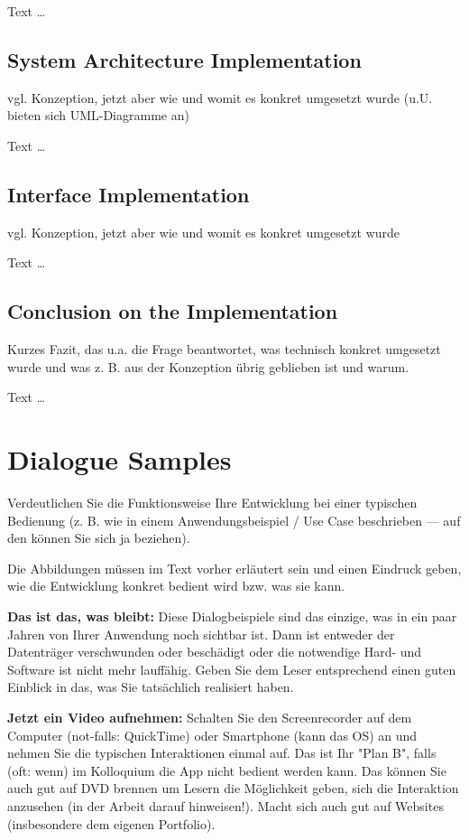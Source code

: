 \documentclass[11pt,a4paper,english]{scrreprt}
\newenvironment{comment}
  {\par\medskip
   \begingroup\color{olive}%
   }
 {\endgroup
  \medskip}
\begin{document}
Text \dots

\section{System Architecture Implementation}
\begin{comment}
vgl. Konzeption, jetzt aber wie und womit es konkret umgesetzt wurde (u.U. bieten sich UML-Diagramme an)
\end{comment}

Text \dots

\section{Interface Implementation}
\begin{comment}
vgl. Konzeption, jetzt aber wie und womit es konkret umgesetzt wurde 
\end{comment}

Text \dots

\section{Conclusion on the Implementation}
\begin{comment}
Kurzes Fazit, das u.a. die Frage beantwortet, was technisch konkret umgesetzt wurde und was z. B. aus der Konzeption übrig geblieben ist und warum.
\end{comment}

Text \dots

\newpage
\chapter{Dialogue Samples}
\begin{comment}
Verdeutlichen Sie die Funktionsweise Ihre Entwicklung bei einer typischen Bedienung (z. B. wie in einem Anwendungsbeispiel / Use Case beschrieben — auf den können Sie sich ja beziehen).

Die Abbildungen müssen im Text vorher erläutert sein und einen Eindruck geben, wie die Entwicklung konkret bedient wird bzw. was sie kann.

\textbf{Das ist das, was bleibt:} Diese Dialogbeispiele sind das einzige, was in ein paar Jahren von Ihrer Anwendung noch sichtbar ist. Dann ist entweder der Datenträger verschwunden oder beschädigt oder die notwendige Hard- und Software ist nicht mehr lauffähig. Geben Sie dem Leser entsprechend einen guten Einblick in das, was Sie tatsächlich realisiert haben.

\textbf{Jetzt ein Video aufnehmen:} Schalten Sie den Screenrecorder auf dem Computer (not-falls: QuickTime) oder Smartphone (kann das OS) an und nehmen Sie die typischen Interaktionen einmal auf. Das ist Ihr "Plan B", falls (oft: wenn) im Kolloquium die App nicht bedient werden kann. Das können Sie auch gut auf DVD brennen um Lesern die Möglichkeit geben, sich die Interaktion anzusehen (in der Arbeit darauf hinweisen!). Macht sich auch gut auf Websites (insbesondere dem eigenen Portfolio).
\end{comment}
\end{document}
